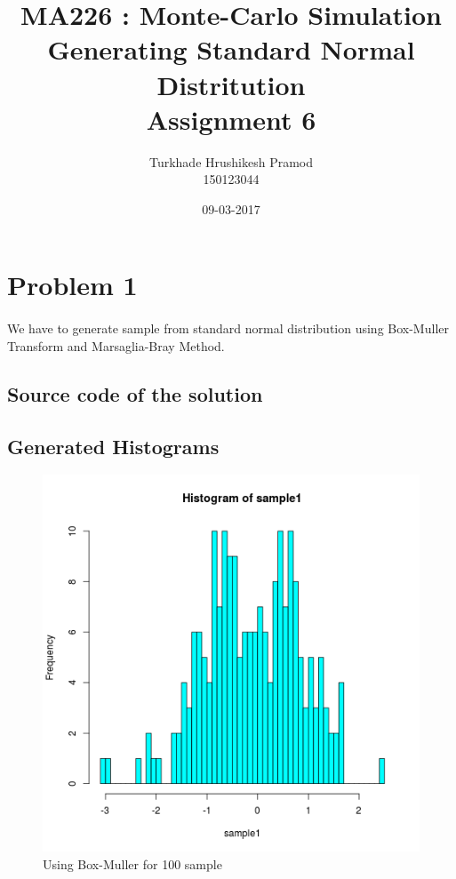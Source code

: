 \documentclass{article}
\title{%
	MA226 : Monte-Carlo Simulation\\
	 Generating Standard Normal Distritution\\
	 \large Assignment 6}
\date{09-03-2017}
\author{%
	Turkhade Hrushikesh Pramod\\
	150123044	}
\begin{document}
	\maketitle
	
	\newpage
	
	\section{Problem 1}
	\paragraph{}
		We have to generate sample from standard normal distribution using Box-Muller Transform and Marsaglia-Bray Method.
				
	\subsection{Source code of the solution}
		
	
	\subsection{Generated Histograms}
			\begin{figure}
  			\includegraphics[width=\linewidth]{pic/que1_hund_1.png}
 			 \caption{Using Box-Muller for 100 sample} 
  			\label{fig:hist1}
		\end{figure}
	
\end{document}
